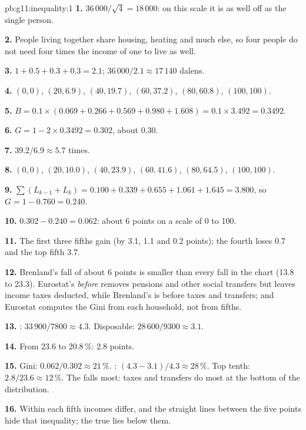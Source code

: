 \begin{solution}{pb:g11:inequality:1}
\textbf{1.} $36\,000/\sqrt{4} = 18\,000$: on this scale it is as well off as the single person.

\textbf{2.} People living together share housing, heating and much else, so four people do not need four times the income of one to live as well.

\textbf{3.} $1 + 0.5 + 0.3 + 0.3 = 2.1$; $36\,000/2.1 \approx 17\,140$ dalens.

\textbf{4.} $(0, 0)$, $(20, 6.9)$, $(40, 19.7)$, $(60, 37.2)$, $(80, 60.8)$, $(100, 100)$.

\textbf{5.} $B = 0.1 \times (0.069 + 0.266 + 0.569 + 0.980 + 1.608) = 0.1 \times 3.492 = 0.3492$.

\textbf{6.} $G = 1 - 2 \times 0.3492 = 0.302$, about 0.30.

\textbf{7.} $39.2/6.9 \approx 5.7$ times.

\textbf{8.} $(0, 0)$, $(20, 10.0)$, $(40, 23.9)$, $(60, 41.6)$, $(80, 64.5)$, $(100, 100)$.

\textbf{9.} $\sum (L_{k-1} + L_k) = 0.100 + 0.339 + 0.655 + 1.061 + 1.645 = 3.800$, so $G = 1 - 0.760 = 0.240$.

\textbf{10.} $0.302 - 0.240 = 0.062$: about 6 points on a scale of 0 to 100.

\textbf{11.} The first three fifths gain (by 3.1, 1.1 and 0.2 points); the fourth loses 0.7 and the top fifth 3.7.

\textbf{12.} Brenland's fall of about 6 points is smaller than every fall in the chart (13.8 to 23.3). Eurostat's \emph{before} removes pensions and other social transfers
but leaves income taxes deducted, while Brenland's is before taxes and transfers; and Eurostat computes the Gini from each household, not from fifths.

\textbf{13.} : $33\,900/7800 \approx 4.3$. Disposable: $28\,600/9300 \approx 3.1$.

\textbf{14.} From 23.6 to 20.8\,\%: 2.8 points.

\textbf{15.} Gini: $0.062/0.302 \approx 21\,\%$. : $(4.3 - 3.1)/4.3 \approx 28\,\%$. Top tenth: $2.8/23.6 \approx 12\,\%$. The  falls most: taxes and
transfers do most at the bottom of the distribution.

\textbf{16.} Within each fifth incomes differ, and the straight lines between the five points hide that inequality; the true  lies below them.


\end{solution}
